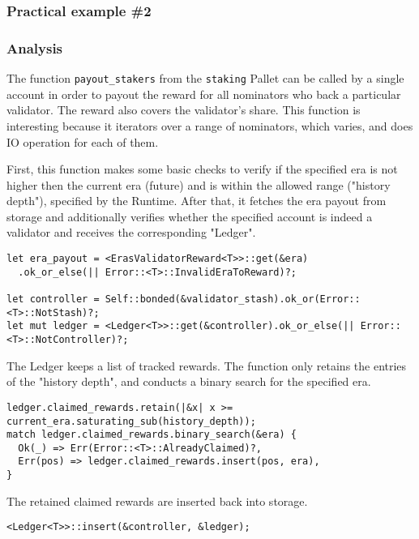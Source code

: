 \documentclass[11pt,a4paper]{article}
\begin{document}
\subsubsection{Practical example \#2}

\subsubsection*{Analysis}

The function \verb|payout_stakers| from the \verb|staking| Pallet can be called by a single account in order
to payout the reward for all nominators who back a particular validator. The reward also covers the validator's
share. This function is interesting because it iterators over a range of nominators, which varies, and does
IO operation for each of them.
\newline

First, this function makes some basic checks to verify if the specified era is not higher then the current era
(future) and is within the allowed range ("history depth"), specified by the Runtime.
After that, it fetches the era payout from storage
and additionally verifies whether the specified account is indeed a validator and receives the corresponding
"Ledger".

\begin{verbatim}
let era_payout = <ErasValidatorReward<T>>::get(&era)
  .ok_or_else(|| Error::<T>::InvalidEraToReward)?;

let controller = Self::bonded(&validator_stash).ok_or(Error::<T>::NotStash)?;
let mut ledger = <Ledger<T>>::get(&controller).ok_or_else(|| Error::<T>::NotController)?;
\end{verbatim}

The Ledger keeps a list of tracked rewards. The function only retains the entries of the "history depth",
and conducts a binary search for the specified era.

\begin{verbatim}
ledger.claimed_rewards.retain(|&x| x >= current_era.saturating_sub(history_depth));
match ledger.claimed_rewards.binary_search(&era) {
  Ok(_) => Err(Error::<T>::AlreadyClaimed)?,
  Err(pos) => ledger.claimed_rewards.insert(pos, era),
}
\end{verbatim}

The retained claimed rewards are inserted back into storage.

\begin{verbatim}
<Ledger<T>>::insert(&controller, &ledger);
\end{verbatim}
\end{document}
